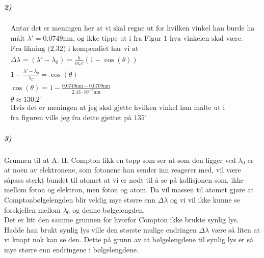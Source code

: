 \documentclass[11pt, A4paper,norsk]{article}
\begin{document}
			\subparagraph{2)}
				\begin{gather*}
\text{Antar det er meningen her at vi skal regne ut for hvilken vinkel han burde ha} \\
\text{målt $\lambda' = 0.0749 \text{nm}$, og ikke tippe ut i fra Figur $1$ hva vinkelen skal være.} \\
\text{Fra likning (2.32) i kompendiet har vi at} \\
\Delta \lambda = (\lambda' - \lambda_0) = \frac{h}{m_e c} (1 - \cos(\theta)) \\
1 - \frac{\lambda' - \lambda_0}{\lambda_C} = \cos(\theta) \\
\cos(\theta) = 1 - \frac{0.0749 \text{nm} - 0.0709 \text{nm}}{2.43 \cdot 10^{-3} \text{nm}} \\
\theta \approx 130.2^{\circ} \\
\text{Hvis det er meningen at jeg skal gjette hvilken vinkel han målte ut i} \\
\text{fra figuren ville jeg fra dette gjettet på $135^{\circ}$}
				\end{gather*}









			\subparagraph{3)}
				\begin{flushleft}
Grunnen til at A. H. Compton fikk en topp som ser ut som den ligger ved $\lambda_0$ er at noen av elektronene, som fotonene han sender inn reagerer med, vil være såpass sterkt bundet til atomet at vi er nødt til å se på kollisjonen som, ikke mellom foton og elektron, men foton og atom. Da vil massen til atomet gjøre at Comptonbølgelengden blir veldig mye større enn $\Delta \lambda$ og vi vil ikke kunne se forskjellen mellom $\lambda_0$ og denne bølgelengden. \\
Det er litt den samme grunnen for hvorfor Compton ikke brukte synlig lys. Hadde han brukt synlig lys ville den største mulige endringen $\Delta \lambda$ være så liten at vi knapt nok kan se den. Dette på grunn av at bølgelengdene til synlig lys er så mye større enn endringene i bølgelengdene.
				\end{flushleft}
			
\end{document}
